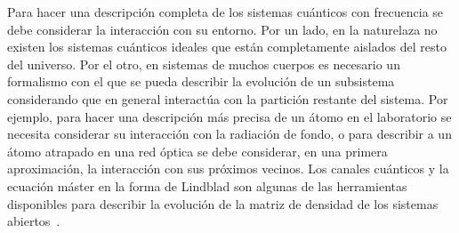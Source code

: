 %
%



Para hacer una descripción completa de los sistemas cuánticos 
con frecuencia se debe considerar la interacción con su entorno. Por un lado, 
en la naturelaza no existen los sistemas cuánticos ideales que 
están completamente aislados del resto del universo. 
Por el otro, en sistemas de muchos cuerpos es necesario un formalismo
con el que se pueda describir la evolución de un subsistema considerando
que en general interactúa con la partición restante del sistema.
Por ejemplo, para hacer una descripción más precisa de un átomo en el laboratorio se
necesita considerar su interacción con la radiación de fondo, 
o para describir a un átomo atrapado en una red óptica se debe considerar, 
en una primera aproximación, la interacción con sus próximos vecinos.
Los canales cuánticos y la ecuación máster  en la forma de Lindblad son algunas
de las herramientas 
disponibles para describir la evolución de la matriz de densidad de
los sistemas abiertos~\cite{nielsen_chuang_2011}. 




